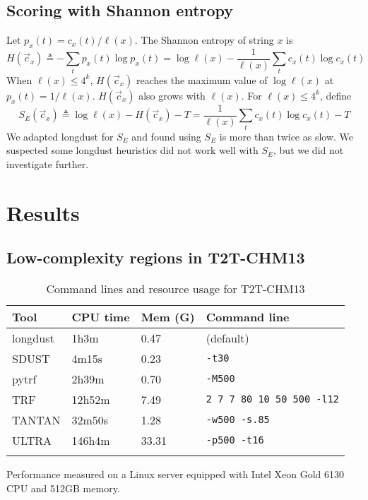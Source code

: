 \documentclass[webpdf,contemporary,large,namedate]{oup-authoring-template}%
\begin{document}
\subsection{Scoring with Shannon entropy}

Let $p_x(t)=c_x(t)/\ell(x)$.
The Shannon entropy of string $x$ is
$$
H(\vec{c}_x)\triangleq-\sum_tp_x(t)\log p_x(t)=\log\ell(x)-\frac{1}{\ell(x)}\sum_t c_x(t)\log c_x(t)
$$
When $\ell(x)\le4^k$, $H(\vec{c}_x)$ reaches the maximum value of $\log\ell(x)$ at $p_x(t)=1/\ell(x)$.
$H(\vec{c}_x)$ also grows with $\ell(x)$.
For $\ell(x)\le4^k$, define
$$
S_E(\vec{c}_x)\triangleq\log\ell(x)-H(\vec{c}_x)-T=\frac{1}{\ell(x)}\sum_t c_x(t)\log c_x(t)-T
$$
We adapted longdust for $S_E$ and found using $S_E$ is more than twice as slow.
We suspected some longdust heuristics did not work well with $S_E$, but we did not investigate further.

\section{Results}

\subsection{Low-complexity regions in T2T-CHM13}

\begin{table}[tb]
\caption{Command lines and resource usage for T2T-CHM13\label{tab:cmd}}
\begin{tabular*}{\columnwidth}{@{\extracolsep\fill}llll@{\extracolsep\fill}}
\toprule
Tool & CPU time & Mem (G) & Command line \\
\midrule
longdust & 1h3m   & 0.47 & (default) \\
SDUST    & 4m15s  & 0.23 & {\tt -t30} \\
pytrf    & 2h39m  & 0.70 & {\tt -M500} \\
TRF      & 12h52m & 7.49 & {\tt 2 7 7 80 10 50 500 -l12} \\
TANTAN   & 32m50s & 1.28 & {\tt -w500 -s.85} \\
ULTRA    & 146h4m & 33.31& {\tt -p500 -t16} \\
\botrule
\end{tabular*}
\begin{tablenotes}\setlength\itemsep{0.0em}
Performance measured on a Linux server equipped with Intel Xeon Gold 6130 CPU and 512GB memory.
\end{tablenotes}
\end{table}
\end{document}
